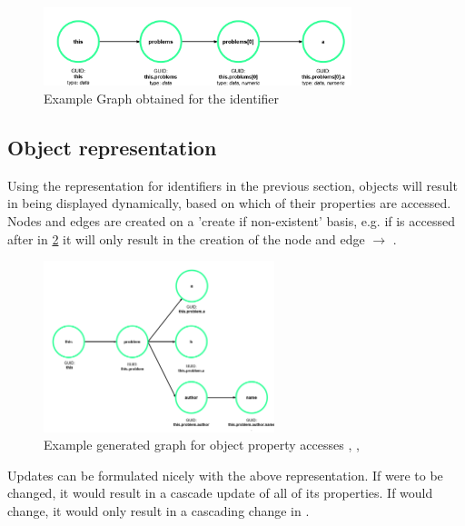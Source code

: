 \begin{figure}[H]
    \centering
    \includegraphics[width=0.8\textwidth]{images/graph_simple.png}
     \caption{Example Graph obtained for the identifier  }
     \label{fig:graph_simple}
\end{figure}

\subsection{Object representation}
Using the representation for identifiers in the previous section, objects will result in being displayed dynamically, based on which of their properties are accessed. Nodes and edges are created on a 'create if non-existent' basis, e.g. if  is accessed after  in \ref{fig:graph_object} it will only result in the creation of the node  and edge  $\rightarrow$  .

\begin{figure}[H]
    \centering
    \includegraphics[width=0.6\textwidth]{images/graph_object.png}
     \caption{Example generated graph for object property accesses ,  ,  }
     \label{fig:graph_object}
\end{figure}

Updates can be formulated nicely with the above representation. If  were to be changed, it would result in a cascade update of all of its properties. If  would change, it would only result in a cascading change in . 

